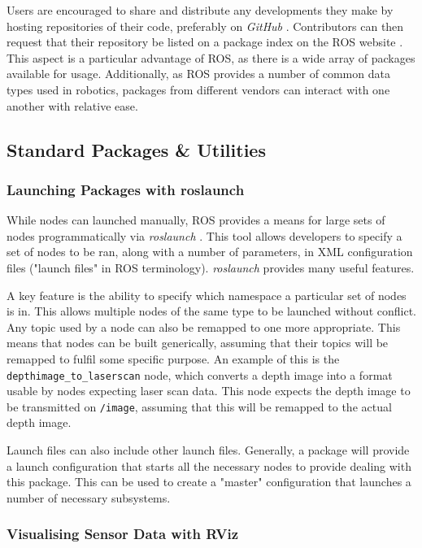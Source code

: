 Users are encouraged to share and distribute any developments they make by hosting repositories of their code, preferably on \emph{GitHub} \cite{ros_wiki_getinvolved}. Contributors can then request that their repository be listed on a package index on the ROS website \cite{ros_wiki_getinvolved}. This aspect is a particular advantage of ROS, as there is a wide array of packages available for usage. Additionally, as ROS provides a number of common data types used in robotics, packages from different vendors can interact with one another with relative ease.

\subsection{Standard Packages \& Utilities}
\subsubsection{Launching Packages with roslaunch}
While nodes can launched manually, ROS provides a means for large sets of nodes programmatically via \emph{roslaunch} \cite{ros_paper, ros_wiki_roslaunch}. This tool allows developers to specify a set of nodes to be ran, along with a number of parameters, in XML configuration files ("launch files" in ROS terminology). \emph{roslaunch} provides many useful features.

A key feature is the ability to specify which namespace a particular set of nodes is in. This allows multiple nodes of the same type to be launched without conflict. Any topic used by a node can also be remapped to one more appropriate. This means that nodes can be built generically, assuming that their topics will be remapped to fulfil some specific purpose. An example of this is the \texttt{depthimage\_to\_laserscan} node, which converts a depth image into a format usable by nodes expecting laser scan data. This node expects the depth image to be transmitted on \texttt{/image}, assuming that this will be remapped to the actual depth image.

Launch files can also include other launch files. Generally, a package will provide a launch configuration that starts all the necessary nodes to provide dealing with this package. This can be used to create a "master" configuration that launches a number of necessary subsystems.

\subsubsection{Visualising Sensor Data with RViz}


